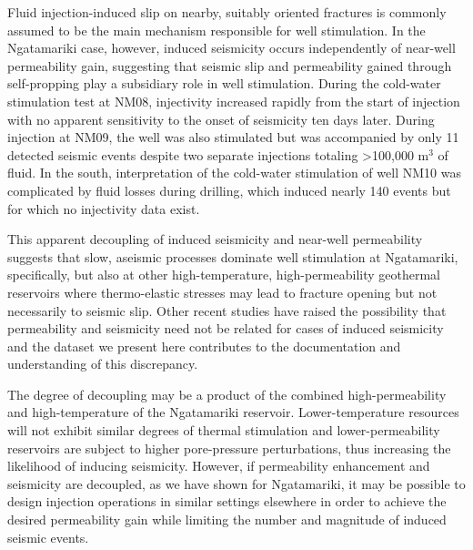 Fluid injection-induced slip on nearby, suitably oriented fractures is commonly assumed to be the main mechanism responsible for well stimulation. In the Ngatamariki case, however, induced seismicity occurs independently of near-well permeability gain, suggesting that seismic slip and permeability gained through self-propping play a subsidiary role in well stimulation. During the cold-water stimulation test at NM08, injectivity increased rapidly from the start of injection with no apparent sensitivity to the onset of seismicity ten days later. During injection at NM09, the well was also stimulated but was accompanied by only 11 detected seismic events despite two separate injections totaling \textgreater100,000 m$^3$ of fluid. In the south, interpretation of the cold-water stimulation of well NM10 was complicated by fluid losses during drilling, which induced nearly 140 events but for which no injectivity data exist.

This apparent decoupling of induced seismicity and near-well permeability suggests that slow, aseismic processes dominate well stimulation at Ngatamariki, specifically, but also at other high-temperature, high-permeability geothermal reservoirs where thermo-elastic stresses may lead to fracture opening but not necessarily to seismic slip. Other recent studies have raised the possibility that permeability and seismicity need not be related for cases of induced seismicity \citep[e.g.][]{Guglielmi_2015, Riffault_2018} and the dataset we present here contributes to the documentation and understanding of this discrepancy.

The degree of decoupling may be a product of the combined high-permeability and high-temperature of the Ngatamariki reservoir. Lower-temperature resources will not exhibit similar degrees of thermal stimulation and lower-permeability reservoirs are subject to higher pore-pressure perturbations, thus increasing the likelihood of inducing seismicity. However, if permeability enhancement and seismicity are decoupled, as we have shown for Ngatamariki, it may be possible to design injection operations in similar settings elsewhere in order to achieve the desired permeability gain while limiting the number and magnitude of induced seismic events.


